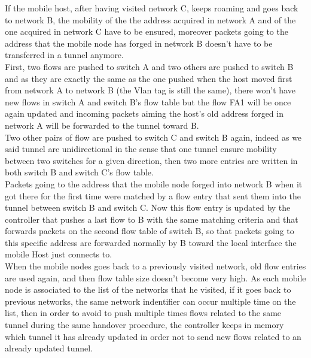 \documentclass{article}
\begin{document}
If the mobile host, after having visited network C, keeps roaming and
goes back to network B, the mobility of the the address acquired in
network A and of the one acquired in network C have to be ensured,
moreover packets going to the address that the mobile node has forged
in network B doesn't have to be transferred in a tunnel anymore.\\
\newline
First, two flows are pushed to switch A and two others are pushed to
switch B and as they are exactly the same as the one pushed when the
host moved first from network A to network B (the Vlan tag is still
the same), there won't have new flows in switch A and switch B's flow
table but the flow FA1 will be once again updated and incoming
packets aiming the host's old address forged in network A will be
forwarded to the tunnel toward B.\\
\newline
Two other pairs of flow are pushed to switch C and switch B again,
indeed as we said tunnel are unidirectional in the sense that one
tunnel ensure mobility between two switches for a given direction, then
two more entries are written in both switch B and switch C's flow
table.\\
\newline
Packets going to the address that the mobile node forged into network
B when it got there for the first time were matched by a flow entry
that sent them into the tunnel between switch B and switch C. Now
this flow entry is updated by the controller that pushes a last flow to
B with the same matching criteria and that forwards packets on the
second flow table of switch B, so that packets going to this specific
address are forwarded normally by B toward the local interface the
mobile Host just connects to. \\
\newline
When the mobile nodes goes back to a previously visited network, old
flow entries are used again, and then flow table size doesn't become
very high. As each mobile node is associated to the list of the
networks that he visited, if it goes back to previous networks, the
same network indentifier can occur multiple time on the list, then in
order to avoid to push multiple times flows related to the same tunnel
during the same handover procedure, the controller keeps in memory
which tunnel it has already updated in order not to send new flows
related to an already updated tunnel.\\
\newline
\end{document}
